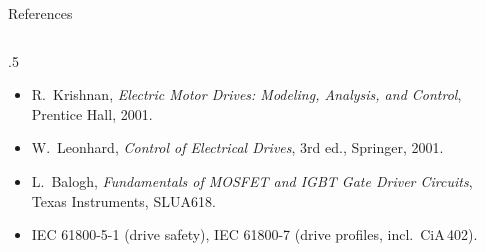 \documentclass[aspectratio=169,10pt]{beamer}
\begin{document}
\begin{frame}{References}
\begin{columns}[T]
\begin{column}{.5\textwidth}
\begin{itemize}
\item R.~Krishnan, \emph{Electric Motor Drives: Modeling, Analysis, and Control}, Prentice Hall, 2001.
\item W.~Leonhard, \emph{Control of Electrical Drives}, 3rd ed., Springer, 2001.
\item L.~Balogh, \emph{Fundamentals of MOSFET and IGBT Gate Driver Circuits}, Texas Instruments, SLUA618.
\item IEC 61800-5-1 (drive safety), IEC 61800-7 (drive profiles, incl.\ CiA\,402).
\end{itemize}
\end{column}
\end{columns}
\end{frame}
\end{document}
